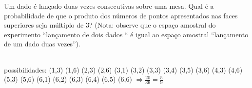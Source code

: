 \begin{ex}
Um dado é lançado duas vezes consecutivas sobre uma mesa. Qual é a probabilidade de que o produto dos números de pontos apresentados nas faces superiores seja múltiplo de 3? (Nota: observe que o espaço amostral do experimento “lançamento de dois dados “ é igual ao espaço amostral “lançamento de um dado duas vezes”).
  \begin{sol}
     \phantom{A} \\
     possibilidades: (1,3) (1,6) (2,3) (2,6) (3,1) (3,2) (3,3) (3,4) (3,5) (3,6) (4,3) (4,6) (5,3) (5,6) (6,1) (6,2) (6,3) (6,4) (6,5) (6,6) $\Longrightarrow \frac{20}{36}=\frac{5}{9}$
  \end{sol}
\end{ex}